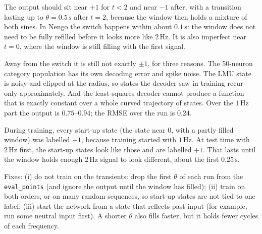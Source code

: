 \documentclass[11pt,letterpaper]{article}
\newcommand{\ans}[1]{\par\vspace{4pt}{\bfseries #1}\quad}
\begin{document}
\ans{Q1}
The output should sit near $+1$ for $t < 2$ and near $-1$ after, with a transition lasting up to $\theta = 0.5\,\mathrm{s}$ after $t = 2$, because the window then holds a mixture of both sines. In Nengo the switch happens within about $0.1\,\mathrm{s}$: the window does not need to be fully refilled before it looks more like $2\,\mathrm{Hz}$. It is also imperfect near $t = 0$, where the window is still filling with the first signal.

Away from the switch it is still not exactly $\pm1$, for three reasons. The 50-neuron category population has its own decoding error and spike noise. The LMU state is noisy and clipped at the radius, so states the decoder saw in training recur only approximately. And the least-squares decoder cannot produce a function that is exactly constant over a whole curved trajectory of states. Over the $1\,\mathrm{Hz}$ part the output is $0.75$--$0.94$; the RMSE over the run is $0.24$.

\ans{Q2}
During training, every start-up state (the state near $0$, with a partly filled window) was labelled $+1$, because training started with $1\,\mathrm{Hz}$. At test time with $2\,\mathrm{Hz}$ first, the start-up states look like those and are labelled $+1$. That lasts until the window holds enough $2\,\mathrm{Hz}$ signal to look different, about the first $0.25\,\mathrm{s}$.

Fixes: (i) do not train on the transients: drop the first $\theta$ of each run from the \texttt{eval\_points} (and ignore the output until the window has filled); (ii) train on both orders, or on many random sequences, so start-up states are not tied to one label; (iii) start the network from a state that reflects past input (for example, run some neutral input first). A shorter $\theta$ also fills faster, but it holds fewer cycles of each frequency.

\begin{center}
\end{center}
\end{document}
